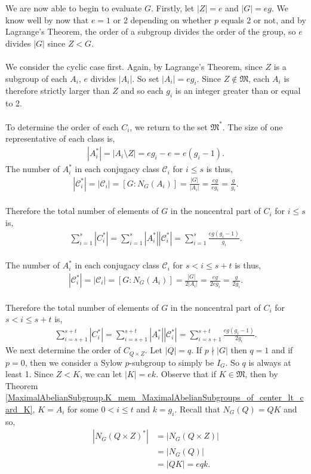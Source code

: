 \begin{footnotesize}
We are now able to begin to evaluate $G$. Firstly, let $|Z| = e$ and $|G| = eg$. We know well by now that $e = 1$ or 2 depending on whether $p$ equals 2 or not, and by Lagrange's Theorem, the order of a subgroup divides the order of the group, so $e$ divides $|G|$ since $Z < G$. \\
\\
We consider the cyclic case first. Again, by Lagrange's Theorem, since $Z$ is a subgroup of each $A_i$, $e$ divides $|A_i|$. So set $|A_i| = eg_i$. Since $Z \notin \mathfrak{M}$, each $A_i$ is therefore strictly larger than $Z$ and so each $g_i$ is an integer greater than or equal to 2. \\
\\
To determine the order of each $C_i$, we return to the set $\mathfrak{M}^*$. The size of one representative of each class is,
\begin{align*} |A_i^*| = |A_i \! \setminus \! Z| = eg_i-e = e(g_i-1). \end{align*}
The number of $A_i^*$ in each conjugacy class $\mathcal{C}_i$ for $i \leq s$ is thus,
\begin{align*} |\mathcal{C}_i^*| = |\mathcal{C}_i| = [G:N_G(A_i)] = \frac{|G|}{|A_i|} = \frac{eg}{eg_i} = \frac{g}{g_i}. \end{align*}
\\
Therefore the total number of elements of $G$ in the noncentral part of $C_i$ for $i \leq s$ is,
\begin{align} \label{classeq1of3} \sum_{i=1}^{s} |C_i^*| = \sum_{i=1}^{s} |A_i^*| |\mathcal{C}_i^*| = \sum_{i=1}^{s} \frac{eg(g_i-1)}{g_i}.
\end{align}
\\
The number of $A_i^*$ in each conjugacy class $\mathcal{C}_i$ for $s < i \leq s+t$ is thus,
\begin{align*} |\mathcal{C}_i^*| = |\mathcal{C}_i| = [G:N_G(A_i)] = \frac{|G|}{2|A_i|} = \frac{eg}{2eg_i} = \frac{g}{2g_i}. \end{align*}
\\
Therefore the total number of elements of $G$ in the noncentral part of $C_i$ for $s < i \leq s+t$ is,
\begin{align}\label{classeq2of3} \sum_{i=s+1}^{s+t} |C_i^*| = \sum_{i=s+1}^{s+t} |A_i^*| |\mathcal{C}_i^*| = \sum_{i=s+1}^{s+t} \frac{eg(g_i-1)}{2g_i}.
\end{align}
We next determine the order of $C_{Q \times Z}$. Let $|Q| = q$. If $p \nmid |G|$ then $q=1$ and if $p = 0$, then we consider a Sylow $p$-subgroup to simply be $I_G$. So $q$ is always at least 1. Since $Z < K$, we can let $|K| = ek$. Observe that if $K \in \mathfrak{M}$, then by Theorem \ref{MaximalAbelianSubgroup.K_mem_MaximalAbelianSubgroups_of_center_lt_card_K}, $K = A_i$ for some $0 < i \leq t$ and $k = g_i$. Recall that $N_G(Q) = QK$ and so,
\begin{align*} |N_G(Q \times Z)^*| &= |N_G(Q \times Z)|  %
\\ &= |N_G(Q)| %
\\ &= |QK| = eqk.
\end{align*}


\end{footnotesize}

